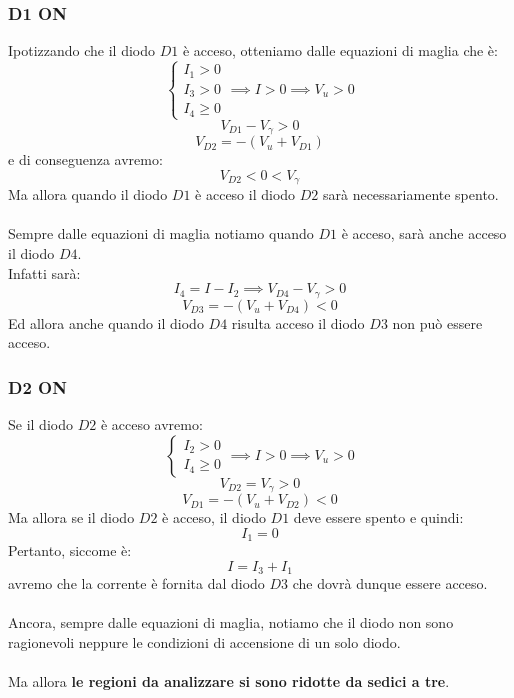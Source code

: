 \documentclass[../main.tex]{subfiles}
\begin{document}
	\subsubsection{D1 ON}
	Ipotizzando che il diodo $D1$ è acceso, otteniamo dalle equazioni di maglia che è:
	$$\begin{cases} I_1 > 0 \\ I_3 > 0 \\ I_4 \geq 0\end{cases} \implies I > 0 \implies V_u > 0$$
	$$V_{D1} - V_\gamma > 0$$
	$$V_{D2} = -(V_u + V_{D1})$$
	e di conseguenza avremo:
	$$V_{D2} < 0 < V_\gamma$$
	Ma allora quando il diodo $D1$ è acceso il diodo $D2$ sarà necessariamente spento.\\\\
	Sempre dalle equazioni di maglia notiamo quando $D1$ è acceso, sarà anche acceso il diodo $D4$. \\
	Infatti sarà:
	$$I_4 = I - I_2 \implies V_{D4} - V_\gamma > 0$$
	$$V_{D3} = -(V_u + V_{D4}) < 0$$
	Ed allora anche quando il diodo $D4$ risulta acceso il diodo $D3$ non può essere acceso.
	\subsubsection{D2 ON}
	Se il diodo $D2$ è acceso avremo:
	$$\begin{cases} I_2 > 0 \\ I_4 \geq 0 \end{cases} \implies I > 0 \implies V_u > 0$$
	$$V_{D2} = V_\gamma > 0$$
	$$V_{D1} = -(V_u + V_{D2}) < 0$$
	Ma allora se il diodo $D2$ è acceso, il diodo $D1$ deve essere spento e quindi:
	$$I_1 = 0$$
	Pertanto, siccome è:
	$$I = I_3 + I_1$$
	avremo che la corrente è fornita dal diodo $D3$ che dovrà dunque essere acceso.\\\\
	Ancora, sempre dalle equazioni di maglia, notiamo che il diodo non sono ragionevoli neppure le condizioni di accensione di un solo diodo.\\\\
	Ma allora \textbf{le regioni da analizzare si sono ridotte da sedici a tre}.
\end{document}
